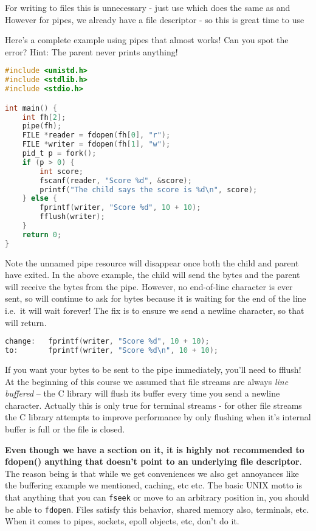 For writing to files this is unnecessary - just use  which does the same as  and  However for pipes, we already have a file descriptor - so this is great time to use 

Here's a complete example using pipes that almost works! Can you spot the error? Hint: The parent never prints anything!

\begin{lstlisting}[language=C]
#include <unistd.h>
#include <stdlib.h>
#include <stdio.h>

int main() {
    int fh[2];
    pipe(fh);
    FILE *reader = fdopen(fh[0], "r");
    FILE *writer = fdopen(fh[1], "w");
    pid_t p = fork();
    if (p > 0) {
        int score;
        fscanf(reader, "Score %d", &score);
        printf("The child says the score is %d\n", score);
    } else {
        fprintf(writer, "Score %d", 10 + 10);
        fflush(writer);
    }
    return 0;
}
\end{lstlisting}

Note the unnamed pipe resource will disappear once both the child and parent have exited.
In the above example, the child will send the bytes and the parent will receive the bytes from the pipe.
However, no end-of-line character is ever sent, so  will continue to ask for bytes because it is waiting for the end of the line i.e.~it will wait forever! The fix is to ensure we send a newline character, so that  will return.

\begin{lstlisting}[language=C]
change:   fprintf(writer, "Score %d", 10 + 10);
to:       fprintf(writer, "Score %d\n", 10 + 10);
\end{lstlisting}

If you want your bytes to be sent to the pipe immediately, you'll need to fflush!
At the beginning of this course we assumed that file streams are always \emph{line buffered} -- the C library will flush its buffer every time you send a newline character.
Actually this is only true for terminal streams - for other file streams the C library attempts to improve performance by only flushing when it's internal buffer is full or the file is closed.

\textbf{Even though we have a section on it, it is highly not recommended to fdopen() anything that doesn't point to an underlying file descriptor}. The reason being is that while we get conveniences we also get annoyances like the buffering example we mentioned, caching, etc etc.
The basic UNIX motto is that anything that you can \texttt{fseek} or move to an arbitrary position in, you should be able to \texttt{fdopen}. Files satisfy this behavior, shared memory also, terminals, etc.
When it comes to pipes, sockets, epoll objects, etc, don't do it.

